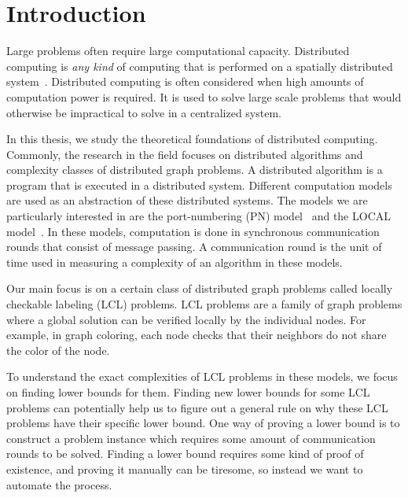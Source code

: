 
\section{Introduction}  \label{sec:introduction}

Large problems often require large computational capacity.
Distributed computing is \emph{any kind} of computing that is performed on a spatially distributed system~\cite{DBLP:books/el/leeuwen90/LamportL90}.
Distributed computing is often considered when high amounts of computation power is required.
It is used to solve large scale problems that would otherwise be impractical to solve in a centralized system.

In this thesis, we study the theoretical foundations of distributed computing.
Commonly, the research in the field focuses on distributed algorithms and complexity classes of distributed graph problems.
A distributed algorithm is a program that is executed in a distributed system.
Different computation models are used as an abstraction of these distributed systems.
The models we are particularly interested in are the port-numbering (PN) model~\cite{DBLP:conf/stoc/Angluin80} and the LOCAL model~\cite{DBLP:conf/focs/Linial87}.
In these models, computation is done in synchronous communication rounds that consist of message passing.
A communication round is the unit of time used in measuring a complexity of an algorithm in these models.

Our main focus is on a certain class of distributed graph problems called locally checkable labeling (LCL) problems.
LCL problems are a family of graph problems where a global solution can be verified locally by the individual nodes.
For example, in graph coloring, each node checks that their neighbors do not share the color of the node.


To understand the exact complexities of LCL problems in these models, we focus on finding lower bounds for them.
Finding new lower bounds for some LCL problems can potentially help us to figure out a general rule on why these LCL problems have their specific lower bound.
One way of proving a lower bound is to construct a problem instance which requires some amount of communication rounds to be solved.
Finding a lower bound requires some kind of proof of existence, and proving it manually can be tiresome, so instead we want to automate the process.

